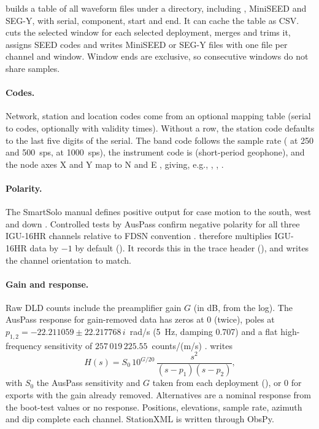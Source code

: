 \documentclass[report]{seismica}
\begin{document}
 builds a table of all waveform files under a directory, including , MiniSEED and SEG-Y, with serial, component, start and end. It can cache the table as CSV.  cuts the selected window for each selected deployment, merges and trims it, assigns SEED codes \citep{fdsn_seed_2012} and writes MiniSEED or SEG-Y files with one file per channel and window. Window ends are exclusive, so consecutive windows do not share samples.

\paragraph{Codes.} Network, station and location codes come from an optional mapping table (serial to codes, optionally with validity times). Without a row, the station code defaults to the last five digits of the serial. The band code follows the sample rate ( at 250 and 500~sps,  at 1000~sps), the instrument code is  (short-period geophone), and the node axes X and Y map to N and E \citep{dtcc_manual}, giving, e.g., , , .

\paragraph{Polarity.} The SmartSolo manual defines positive output for case motion to the south, west and down \citep{dtcc_manual}. Controlled tests by AusPass confirm negative polarity for all three IGU-16HR channels relative to FDSN convention \citep{auspass_data}.  therefore multiplies IGU-16HR data by $-1$ by default (). It records this in the trace header (), and  writes the channel orientation to match.

\paragraph{Gain and response.} Raw DLD counts include the preamplifier gain $G$ (in dB, from the log). The AusPass response for gain-removed data has zeros at 0 (twice), poles at $p_{1,2} = -22.211059 \pm 22.217768\,i$~rad/s (5~Hz, damping 0.707) and a flat high-frequency sensitivity of $257\,019\,225.55$~counts/(m/s) \citep{auspass_nodes}.  writes
\begin{equation}\label{eq:resp}
H(s) = S_0\,10^{G/20}\,\frac{s^2}{(s-p_1)(s-p_2)},
\end{equation}
with $S_0$ the AusPass sensitivity and $G$ taken from each deployment (), or 0 for exports with the gain already removed. Alternatives are a nominal response from the boot-test values or no response. Positions, elevations, sample rate, azimuth and dip complete each channel. StationXML is written through ObsPy.
\end{document}
